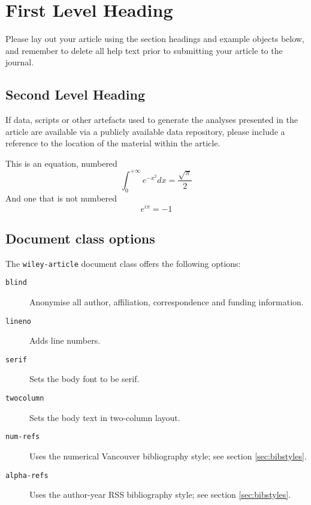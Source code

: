 \section{First Level Heading}



Please lay out your article using the section headings and example objects below, and remember to delete all help text prior to submitting your article to the journal.


\subsection{Second Level Heading}
If data, scripts or other artefacts used to generate the analyses presented in the article are available via a publicly available data repository, please include a reference to the location of the material within the article.

This is an equation, numbered
\begin{equation}
       \int_0^{+\infty}e^{-x^2}dx=\frac{\sqrt{\pi}}{2}
\end{equation}
And one that is not numbered
\begin{equation*}
       e^{i\pi}=-1
\end{equation*}

\subsection{Document class options}

The \texttt{wiley-article} document class offers the following options:

\begin{description}
       \item[\texttt{blind}] Anonymise all author, affiliation, correspondence
             and funding information.

       \item[\texttt{lineno}] Adds line numbers.

       \item[\texttt{serif}] Sets the body font to be serif.

       \item[\texttt{twocolumn}] Sets the body text in two-column layout.

       \item[\texttt{num-refs}] Uses the numerical Vancouver bibliography style; see section \ref{sec:bibstyles}.

       \item[\texttt{alpha-refs}] Uses the author-year RSS bibliography style; see section \ref{sec:bibstyles}.
\end{description}

